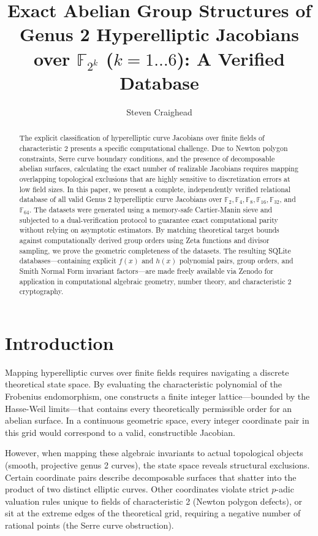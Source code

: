 \documentclass[12pt, letterpaper]{article}
\title{Exact Abelian Group Structures of Genus 2 Hyperelliptic Jacobians over $\mathbb{F}_{2^k}$ ($k=1 \dots 6$): A Verified Database}
\author{Steven Craighead}
\date{}
\begin{document}
\maketitle

\begin{abstract}
The explicit classification of hyperelliptic curve Jacobians over finite fields of characteristic 2 presents a specific computational challenge. Due to Newton polygon constraints, Serre curve boundary conditions, and the presence of decomposable abelian surfaces, calculating the exact number of realizable Jacobians requires mapping overlapping topological exclusions that are highly sensitive to discretization errors at low field sizes. In this paper, we present a complete, independently verified relational database of all valid Genus 2 hyperelliptic curve Jacobians over $\mathbb{F}_2, \mathbb{F}_4, \mathbb{F}_8, \mathbb{F}_{16}, \mathbb{F}_{32}$, and $\mathbb{F}_{64}$. The datasets were generated using a memory-safe Cartier-Manin sieve and subjected to a dual-verification protocol to guarantee exact computational parity without relying on asymptotic estimators. By matching theoretical target bounds against computationally derived group orders using Zeta functions and divisor sampling, we prove the geometric completeness of the datasets. The resulting SQLite databases---containing explicit $f(x)$ and $h(x)$ polynomial pairs, group orders, and Smith Normal Form invariant factors---are made freely available via Zenodo for application in computational algebraic geometry, number theory, and characteristic 2 cryptography.
\end{abstract}

\section{Introduction}
Mapping hyperelliptic curves over finite fields requires navigating a discrete theoretical state space. By evaluating the characteristic polynomial of the Frobenius endomorphism, one constructs a finite integer lattice---bounded by the Hasse-Weil limits---that contains every theoretically permissible order for an abelian surface. In a continuous geometric space, every integer coordinate pair in this grid would correspond to a valid, constructible Jacobian.

However, when mapping these algebraic invariants to actual topological objects (smooth, projective genus 2 curves), the state space reveals structural exclusions. Certain coordinate pairs describe decomposable surfaces that shatter into the product of two distinct elliptic curves. Other coordinates violate strict $p$-adic valuation rules unique to fields of characteristic 2 (Newton polygon defects), or sit at the extreme edges of the theoretical grid, requiring a negative number of rational points (the Serre curve obstruction).
\end{document}
